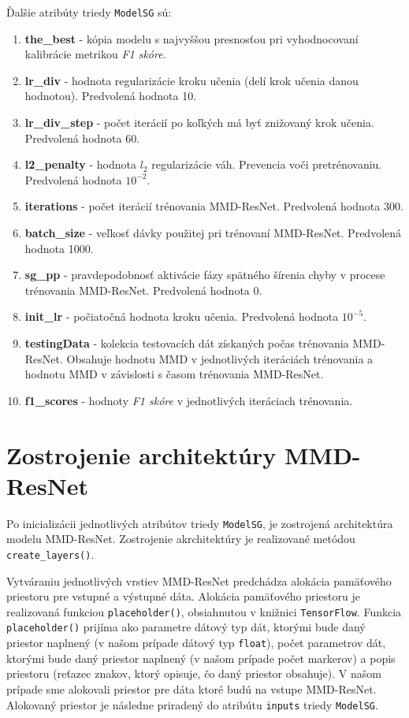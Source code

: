 Ďalšie atribúty triedy \texttt{ModelSG} sú:
\begin{enumerate}
    \item \textbf{the\_best} - kópia modelu s najvyššou presnosťou pri vyhodnocovaní kalibrácie metrikou \textit{F1 skóre}.
    \item \textbf{lr\_div} - hodnota regularizácie kroku učenia (delí krok učenia danou hodnotou). Predvolená hodnota 10.
    \item \textbf{lr\_div\_step} - počet iterácií po koľkých má byť znižovaný krok učenia. Predvolená hodnota 60.
    \item \textbf{l2\_penalty} - hodnota $l_2$ regularizácie váh. Prevencia voči pretrénovaniu. Predvolená hodnota $10^{-2}$.
    \item \textbf{iterations} - počet iterácií trénovania MMD-ResNet. Predvolená hodnota 300.
    \item \textbf{batch\_size} - veľkosť dávky použitej pri trénovaní MMD-ResNet. Predvolená hodnota 1000.
    \item \textbf{sg\_pp} - pravdepodobnosť aktivácie fázy spätného šírenia chyby v procese trénovania MMD-ResNet. Predvolená hodnota 0.
    \item \textbf{init\_lr} - počiatočná hodnota kroku učenia. Predvolená hodnota $10^{-5}$.
    \item \textbf{testingData} - kolekcia testovacích dát získaných počas trénovania MMD-ResNet. Obsahuje hodnotu MMD v jednotlivých iteráciách trénovania a hodnotu MMD v závislosti s časom trénovania MMD-ResNet.
    \item \textbf{f1\_scores} - hodnoty \textit{F1 skóre} v jednotlivých iteráciach trénovania.
\end{enumerate}

\section{Zostrojenie architektúry MMD-ResNet}

Po inicializácii jednotlivých atribútov triedy \texttt{ModelSG}, je zostrojená architektúra modelu MMD-ResNet. Zostrojenie akrchitektúry je realizované metódou \texttt{create_layers()}. 

Vytváraniu jednotlivých vrstiev MMD-ResNet predchádza alokácia pamäťového priestoru pre vstupné a výstupné dáta. Alokácia pamäťového priestoru je realizovaná funkciou \texttt{placeholder()}, obsiahnutou v knižnici \texttt{TensorFlow}. Funkcia \texttt{placeholder()} prijíma ako parametre dátový typ dát, ktorými bude daný priestor naplnený (v našom prípade dátový typ \texttt{float}), počet parametrov dát, ktorými bude daný priestor naplnený (v našom prípade počet markerov) a popis priestoru (reťazec znakov, ktorý opisuje, čo daný priestor obsahuje). V našom prípade sme alokovali priestor pre dáta ktoré budú na vstupe MMD-ResNet. Alokovaný priestor je následne priradený do atribútu \texttt{inputs} triedy \texttt{ModelSG}.

